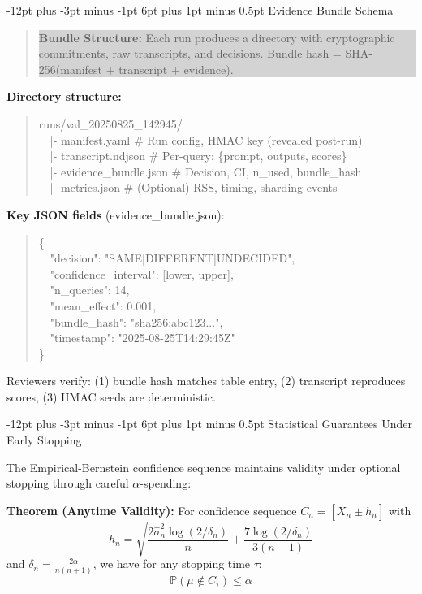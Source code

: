\documentclass[11pt]{article}
\makeatletter
\renewcommand\subsection{\@startsection{subsection}{2}{\z@}%
  {-12pt plus -3pt minus -1pt}%
  {6pt plus 1pt minus 0.5pt}%
  {\normalfont\large\bfseries}}
\makeatother
\begin{document}
\subsection{Evidence Bundle Schema}

\begin{quote}
\colorbox{lightgray}{\parbox{0.95\textwidth}{
\textbf{Bundle Structure:} Each run produces a directory with cryptographic commitments, raw transcripts, and decisions. Bundle hash = SHA-256(manifest + transcript + evidence).
}}
\end{quote}

\noindent\textbf{Directory structure:}
\begin{quote}
\small
runs/val\_20250825\_142945/\\
~~|- manifest.yaml \hfill \# Run config, HMAC key (revealed post-run)\\
~~|- transcript.ndjson \hfill \# Per-query: \{prompt, outputs, scores\}\\
~~|- evidence\_bundle.json \hfill \# Decision, CI, n\_used, bundle\_hash\\
~~|- metrics.json \hfill \# (Optional) RSS, timing, sharding events
\end{quote}

\noindent\textbf{Key JSON fields} (evidence\_bundle.json):
\begin{quote}
\small
\{\\
~~"decision": "SAME|DIFFERENT|UNDECIDED",\\
~~"confidence\_interval": [lower, upper],\\
~~"n\_queries": 14,\\
~~"mean\_effect": 0.001,\\
~~"bundle\_hash": "sha256:abc123...",\\
~~"timestamp": "2025-08-25T14:29:45Z"\\
\}
\end{quote}

Reviewers verify: (1) bundle hash matches table entry, (2) transcript reproduces scores, (3) HMAC seeds are deterministic.

\subsection{Statistical Guarantees Under Early Stopping}

The Empirical-Bernstein confidence sequence maintains validity under optional stopping through careful $\alpha$-spending:

\textbf{Theorem (Anytime Validity):} For confidence sequence $C_n = [\overline{X}_n \pm h_n]$ with 
$$h_n = \sqrt{\frac{2\hat{\sigma}^2_n \log(2/\delta_n)}{n}} + \frac{7\log(2/\delta_n)}{3(n-1)}$$
and $\delta_n = \frac{2\alpha}{n(n+1)}$, we have for any stopping time $\tau$:
$$\mathbb{P}(\mu \notin C_\tau) \leq \alpha$$
\end{document}
